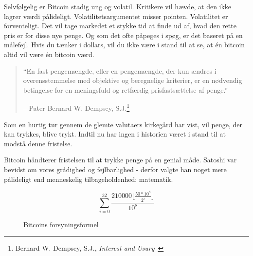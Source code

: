 \documentclass[paper=6in:9in,pagesize=pdftex,
               headinclude=on,footinclude=on,12pt]{scrbook}
\begin{document}
Selvfølgelig er Bitcoin stadig ung og volatil. Kritikere vil hævde, at den ikke lagrer værdi pålideligt. Volatilitetsargumentet misser pointen. Volatilitet er forventeligt. Det vil tage markedet et stykke tid at finde ud af, hvad den rette pris er for disse nye penge. Og som det ofte påpeges i spøg, er det baseret på en målefejl. Hvis du tænker i dollars, vil du ikke være i stand til at se, at \'en bitcoin altid vil være \'en bitcoin værd.\begin{quotation}\begin{samepage} \enquote{En fast pengemængde, eller en pengemængde, der kun ændres i overensstemmelse med objektive og beregnelige kriterier, er en nødvendig betingelse for en meningsfuld og retfærdig prisfastsættelse af penge.} \begin{flushright} -- Pater Bernard W. Dempsey, S.J.\footnote{Bernard W. Dempsey, S.J., \textit{Interest and Usury}~\cite[p.~210]{dempsey_interest_1943}}
\end{flushright}\end{samepage}\end{quotation}

\newpage

Som en hurtig tur gennem de glemte valutaers kirkegård har vist, vil penge, der kan trykkes, blive trykt. Indtil nu har ingen i historien været i stand til at modstå denne fristelse.

Bitcoin håndterer fristelsen til at trykke penge på en genial måde. Satoshi var bevidst om vores grådighed og fejlbarlighed - derfor valgte han noget mere pålideligt end menneskelig tilbageholdenhed: matematik.\begin{figure}
  \centering
  \begin{equation}
  \sum\limits_{i=0}^{32} \frac{210000 \lfloor \frac{50*10^8}{2^i} \rfloor}{10^8}
  \end{equation}
  \caption{Bitcoins forsyningsformel}
  \label{fig:supply-formula-white}
\end{figure}
\end{document}
